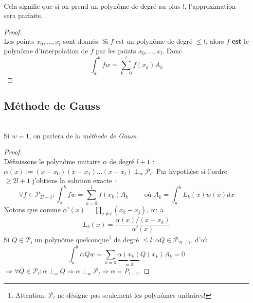 	\ \\
	Cela signifie que si on prend un polynôme de degré au plus $l$, l'approximation 
	sera parfaite.
	
	\begin{proof}\ \\
	Les points $x_0, \dots, x_l$ sont donnés. Si $f$ est un polynôme de degré $\leq 
	l$, alors $f$ \textbf{est} le polynôme d'interpolation de $f$ par les points 
	$x_0,\dots, x_l$. Donc
	\begin{equation}
	\int_a^b fw = \sum_{k=0}^l f(x_k)A_k
	\end{equation}
	\end{proof}
	
	\subsection{Méthode de Gauss}
	\ \\
	Si $w=1$, on parlera de la \textit{méthode de Gauss}.
	
	\begin{proof}\ \\
	Définissons le polynôme unitaire $\alpha$ de degré $l+1$ : $\alpha(x) := (x-x_0)
	(x-x_1)	\dots(x-x_l) \perp_w \mathcal{P}_l$. Par hypothèse si l'ordre $\geq 2l+1$ 
	j'obtiens la solution exacte :
	\begin{equation}
	\forall f \in \mathcal{P}_{2l+1} : \int_a^b fw = \sum_{k=0}^l f(x_k)A_k\qquad 
	\text{ où } A_k = \int_a^b L_k(x)w(x)dx
	\end{equation}
	Notons que comme $\alpha'(x) = \prod_{j\neq l} (x_k-x_j)$, on a 
	\begin{equation}
	L_k(x) = \frac{\alpha(x)/(x-x_k)}{\alpha'(x)}
	\end{equation}
	Si $Q \in \mathcal{P}_l$ un polynôme quelconque\footnote{Attention, $\mathcal{P}_l$ 
	ne désigne pas seulement les polynômes unitaires!} de degré $\leq l : \alpha Q \in 
	\mathcal{P}_{2l+1}$, d'où
	\begin{equation}
	\int_a^b \alpha Q w = \sum_{k=0} \underbrace{\alpha(x_k)}_{=0}Q(x_k)A_k = 0
	\end{equation}
	$\Longrightarrow \forall Q \in \mathcal{P}_l : \alpha \perp_w Q \Rightarrow 
	\alpha \perp_w \mathcal{P}_l \Rightarrow \alpha = P_{l+1}$.
	\end{proof}
	
